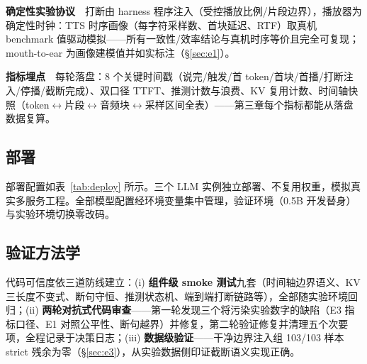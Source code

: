\documentclass[conference]{IEEEtran}
\theoremstyle{definition}
\begin{document}
\textbf{确定性实验协议}　打断由 harness 程序注入（受控播放比例/片段边界），播放器为确定性时钟：TTS 时序画像（每字符采样数、首块延迟、RTF）取真机 benchmark 值驱动模拟——所有一致性/效率结论与真机时序等价且完全可复现；mouth-to-ear 为画像建模值并如实标注（\S\ref{sec:e1}）。

\textbf{指标埋点}　每轮落盘：8 个关键时间戳（说完/触发/首 token/首块/首播/打断注入/停播/截断完成）、双口径 TTFT、推测计数与浪费、KV 复用计数、时间轴快照（token$\leftrightarrow$片段$\leftrightarrow$音频块$\leftrightarrow$采样区间全表）——第三章每个指标都能从落盘数据复算。

\subsection{部署}
部署配置如表~\ref{tab:deploy} 所示。三个 LLM 实例独立部署、不复用权重，模拟真实多服务工程。全部模型配置经环境变量集中管理，验证环境（0.5B 开发替身）与实验环境切换零改码。

\begin{table}[t]
\caption{Deployment configuration}
\label{tab:deploy}
\centering
{}
\end{table}

\subsection{验证方法学}
代码可信度依三道防线建立：(i) \textbf{组件级 smoke 测试}九套（时间轴边界语义、KV 三长度不变式、断句守恒、推测状态机、端到端打断链路等），全部随实验环境回归；(ii) \textbf{两轮对抗式代码审查}——第一轮发现三个将污染实验数字的缺陷（E3 指标口径、E1 对照公平性、断句越界）并修复，第二轮验证修复并清理五个次要项，全程记录于决策日志；(iii) \textbf{数据级验证}——干净边界注入组 103/103 样本 strict 残余为零（\S\ref{sec:e3}），从实验数据侧印证截断语义实现正确。
\end{document}
